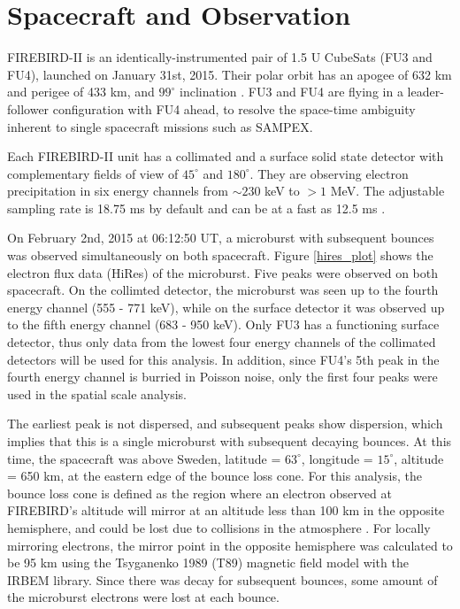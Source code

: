 \documentclass[draft,linenumbers]{agujournal}
\begin{document}
\section{Spacecraft and Observation} \label{obs} %
FIREBIRD-II is an identically-instrumented pair of 1.5 U CubeSats (FU3 and FU4), launched on January 31st, 2015. Their polar orbit has an apogee of 632 km and perigee of 433 km, and $99^{\circ}$ inclination \citep{Crew16}. FU3 and FU4 are flying in a leader-follower configuration with FU4 ahead, to resolve the space-time ambiguity inherent to single spacecraft missions such as SAMPEX.

Each FIREBIRD-II unit has a collimated and a surface solid state detector with complementary fields of view of $45^{\circ}$ and $180^{\circ}$. They are observing electron precipitation in six energy channels from $\sim 230$ keV to $> 1$ MeV. The adjustable sampling rate is 18.75 ms by default and can be at a fast as 12.5 ms \citep{Crew16}. 

On February 2nd, 2015 at 06:12:50 UT, a microburst with subsequent bounces was observed simultaneously on both spacecraft. Figure \ref{hires_plot} shows the electron flux data (HiRes) of the microburst. Five peaks were observed on both spacecraft. On the collimted detector, the microburst was seen up to the fourth energy channel (555 - 771 keV), while on the surface detector it was observed up to the fifth energy channel (683 - 950 keV). Only FU3 has a functioning surface detector, thus only data from the lowest four energy channels of the collimated detectors will be used for this analysis. In addition, since FU4's 5th peak in the fourth energy channel is burried in Poisson noise, only the first four peaks were used in the spatial scale analysis.

The earliest peak is not dispersed, and subsequent peaks show dispersion, which implies that this is a single microburst with subsequent decaying bounces. At this time, the spacecraft was above Sweden, latitude = $63^{\circ}$, longitude = $15^{\circ}$, altitude = 650 km, at the eastern edge of the bounce loss cone. For this analysis, the bounce loss cone is defined as the region where an electron observed at FIREBIRD's altitude will mirror at an altitude less than 100 km in the opposite hemisphere, and could be lost due to collisions in the atmosphere \citep{Abel1998_1}. For locally mirroring electrons, the mirror point in the opposite hemisphere was calculated to be 95 km using the Tsyganenko 1989 (T89) magnetic field model \citep{Tsyganenko89} with the IRBEM library. Since there was decay for subsequent bounces, some amount of the microburst electrons were lost at each bounce. 
\end{document}
